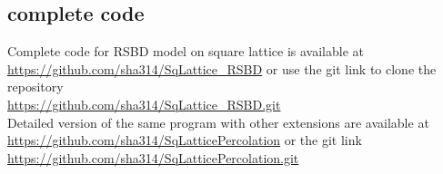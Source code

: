 %	
	
	\subsection{complete code}\label{sect:complete-code-percolation}
	Complete code for RSBD model on square lattice is available at\\
	\url{https://github.com/sha314/SqLattice_RSBD}
	or use the git link to clone the repository\\
	\url{https://github.com/sha314/SqLattice_RSBD.git}
	\\
	Detailed version of the same program with other extensions are available at\\
	\url{https://github.com/sha314/SqLatticePercolation}
	or the git link\\
	\url{https://github.com/sha314/SqLatticePercolation.git}



